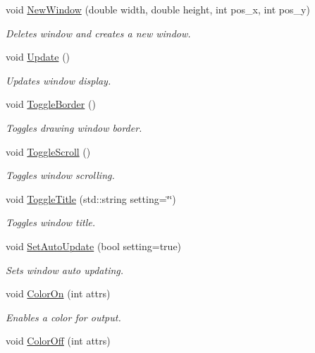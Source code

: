 \begin{DoxyCompactItemize}
void \hyperlink{classostendo_1_1Window_a12e3cedcaa35c674e2de4a35e9f6ae48}{New\+Window} (double width, double height, int pos\+\_\+x, int pos\+\_\+y)
\begin{DoxyCompactList}\small\item\em Deletes window and creates a new window. \end{DoxyCompactList}\item 
void \hyperlink{classostendo_1_1Window_a31f6220b282ed1bf705a0d95d52cd051}{Update} ()
\begin{DoxyCompactList}\small\item\em Updates window display. \end{DoxyCompactList}\item 
void \hyperlink{classostendo_1_1Window_a0f4f6327f9f42fa76c08d18d97059d7c}{Toggle\+Border} ()
\begin{DoxyCompactList}\small\item\em Toggles drawing window border. \end{DoxyCompactList}\item 
void \hyperlink{classostendo_1_1Window_ac02e38f9ad5b08a18f3bcc7b70a0944e}{Toggle\+Scroll} ()
\begin{DoxyCompactList}\small\item\em Toggles window scrolling. \end{DoxyCompactList}\item 
void \hyperlink{classostendo_1_1Window_a7772b7589637c6ddebd87697c47aefc3}{Toggle\+Title} (std\+::string setting=\char`\"{}\char`\"{})
\begin{DoxyCompactList}\small\item\em Toggles window title. \end{DoxyCompactList}\item 
void \hyperlink{classostendo_1_1Window_a3d4579a58a6e14b7032390b17fca2313}{Set\+Auto\+Update} (bool setting=true)
\begin{DoxyCompactList}\small\item\em Sets window auto updating. \end{DoxyCompactList}\item 
void \hyperlink{classostendo_1_1Window_a4944301b33c64531c83c2bba55c35bc6}{Color\+On} (int attrs)
\begin{DoxyCompactList}\small\item\em Enables a color for output. \end{DoxyCompactList}\item 
void \hyperlink{classostendo_1_1Window_a903272ec03cce94e8505dcd9f3317375}{Color\+Off} (int attrs)

\end{DoxyCompactItemize}
